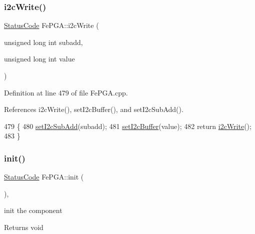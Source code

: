 \mbox{\label{classFePGA_a45e1cfdf1f303f3958bf6a83c4e8039b}} 
\subsubsection{\texorpdfstring{i2c\+Write()}{i2cWrite()}\hspace{0.1cm}{\footnotesize\ttfamily [2/2]}}
{\footnotesize\ttfamily \hyperlink{classStatusCode}{Status\+Code} Fe\+P\+G\+A\+::i2c\+Write (\begin{DoxyParamCaption}\item[{unsigned long int}]{subadd,  }\item[{unsigned long int}]{value }\end{DoxyParamCaption})}



Definition at line 479 of file Fe\+P\+G\+A.\+cpp.



References i2c\+Write(), set\+I2c\+Buffer(), and set\+I2c\+Sub\+Add().


\begin{DoxyCode}
479                                                                            \{
480   \hyperlink{classFePGA_a37c1ee5bf89667c641f321479697166f}{setI2cSubAdd}(subadd);
481   \hyperlink{classFePGA_aaf52ed549f6b79d53f49c3f85c5fbad2}{setI2cBuffer}(value);
482   \textcolor{keywordflow}{return} \hyperlink{classFePGA_a27b9c9bb486cea35b1bbcac5da96f527}{i2cWrite}();
483 \}
\end{DoxyCode}
\mbox{\label{classFePGA_a5355858b1b8deedcc12acff80f025804}} 
\subsubsection{\texorpdfstring{init()}{init()}}
{\footnotesize\ttfamily \hyperlink{classStatusCode}{Status\+Code} Fe\+P\+G\+A\+::init (\begin{DoxyParamCaption}{ }\end{DoxyParamCaption})\hspace{0.3cm}{\ttfamily [inline]}, {\ttfamily [virtual]}}

init the component

\begin{DoxyReturn}{Returns}
void 
\end{DoxyReturn}


